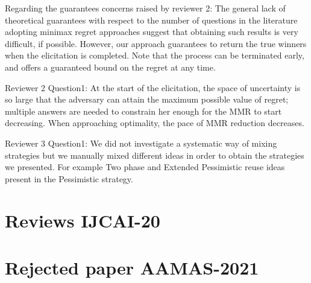 \documentclass[version=3.21, pagesize, twoside=off, bibliography=totoc, DIV=calc, fontsize=12pt, a4paper]{scrartcl}
\begin{document}
Regarding the guarantees concerns raised by reviewer 2: The general lack of theoretical guarantees with respect to the number of questions in the literature adopting minimax regret approaches suggest that obtaining such results is very difficult, if possible. However, our approach guarantees to return the true winners when the elicitation is completed. Note that the process can be terminated early, and offers a guaranteed bound on the regret at any time.

Reviewer 2 Question1: At the start of the elicitation, the space of uncertainty is so large that the adversary can attain the maximum possible value of regret; multiple answers are needed to constrain her enough for the MMR to start decreasing. When approaching optimality, the pace of MMR reduction decreases.

Reviewer 3 Question1: We did not investigate a systematic way of mixing strategies but we manually mixed different ideas in order to obtain the strategies we presented. For example Two phase and Extended Pessimistic reuse ideas present in the Pessimistic strategy.

\section{Reviews IJCAI-20}


\section{Rejected paper AAMAS-2021}
%

%
\end{document}
